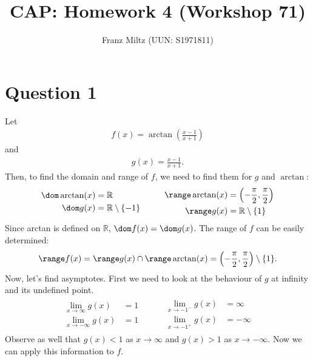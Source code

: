 \documentclass{article}
\title{CAP: Homework 4 (Workshop 71)}
\author{Franz Miltz (UUN: S1971811)}
\begin{document}
\maketitle
\section*{Question 1}
Let
\begin{align*}
  f(x) = \arctan\left(\frac{x-1}{x+1}\right)
\end{align*}
and
\begin{align*}
  g(x) = \frac{x-1}{x+1}.
\end{align*}
Then, to find the domain and range of $f$, we need to find them for $g$ and $\arctan$:
\begin{align*}
  \begin{aligned}
    \dom \arctan(x) & = \mathbb{R}                  \\
    \dom g(x)       & = \mathbb{R} \setminus \{-1\}
  \end{aligned}
  \hspace{1cm}
  \begin{aligned}
    \range \arctan(x) & = \left(-\frac{\pi}{2}, \frac{\pi}{2}\right) \\
    \range g(x)       & = \mathbb{R}\setminus\{1\}
  \end{aligned}
\end{align*}
Since arctan is defined on $\mathbb{R}$, $\dom f(x) = \dom g(x)$. The range of $f$ can be easily determined:
\begin{align*}
  \range f(x) = \range g(x) \cap \range \arctan(x) = \left(-\frac{\pi}{2}, \frac{\pi}{2}\right) \setminus \{1\}.
\end{align*}
Now, let's find asymptotes. First we need to look at the behaviour of $g$ at infinity and its undefined point.
\begin{align*}
  \begin{aligned}
    \lim_{x\to\infty}g(x)  & = 1 \\
    \lim_{x\to-\infty}g(x) & = 1
  \end{aligned}
  \hspace{1cm}
  \begin{aligned}
    \lim_{x\to-1^-}g(x) & =\infty  \\
    \lim_{x\to-1^+}g(x) & =-\infty
  \end{aligned}
\end{align*}
Observe as well that $g(x)<1$ as $x\to\infty$ and $g(x)>1$ as $x\to-\infty$. Now we can apply this information to $f$.
\end{document}
